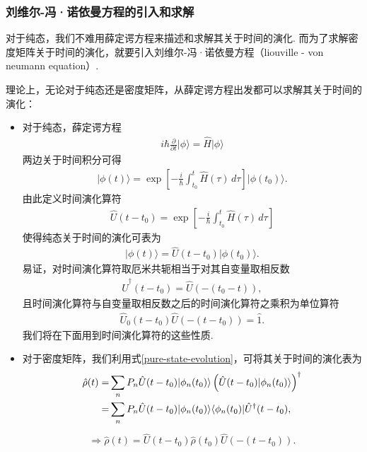 \documentclass{assignment}
\begin{document}
\subsubsection{刘维尔-冯·诺依曼方程的引入和求解}
对于纯态，我们不难用薛定谔方程来描述和求解其关于时间的演化. 而为了求解密度矩阵关于时间的演化，就要引入刘维尔-冯·诺依曼方程（liouville - von neumann equation）.

理论上，无论对于纯态还是密度矩阵，从薛定谔方程出发都可以求解其关于时间的演化：
\begin{itemize}
    \item 对于纯态，薛定谔方程
    \begin{align}
        i\hbar\frac{\partial}{\partial t}\lvert\phi\rangle=\hat{H}\lvert\phi\rangle
    \end{align}
    两边关于时间积分可得
    \begin{align}
        \lvert\phi(t)\rangle=\exp\left[-\frac{i}{\hbar}\int_{t_0}^t\hat{H}(\tau)\,d\tau\right]\lvert\phi(t_0)\rangle.
    \end{align}
    由此定义时间演化算符
    \begin{align}
        \hat{U}(t-t_0)=\exp\left[-\frac{i}{\hbar}\int_{t_0}^t\hat{H}(\tau)\,d\tau\right]
    \end{align}
    使得纯态关于时间的演化可表为
    \begin{align}
        \label{pure-state-evolution}
        \boxed{\lvert\phi(t)\rangle=\hat{U}(t-t_0)\lvert\phi(t_0)\rangle.}
    \end{align}
    易证，对时间演化算符取厄米共轭相当于对其自变量取相反数
    \begin{align}
        \hat{U}^{\dagger}(t-t_0)=\hat{U}(-(t_0-t)),
    \end{align}
    且时间演化算符与自变量取相反数之后的时间演化算符之乘积为单位算符
    \begin{align}
        \hat{U}_0(t-t_0)\hat{U}(-(t-t_0))=\hat{1}.
    \end{align}
    我们将在下面用到时间演化算符的这些性质.
    \item 对于密度矩阵，我们利用式\eqref{pure-state-evolution}，可将其关于时间的演化表为
    \begin{align}
        \notag\hat{\rho}(t)=&\sum_nP_n\hat{U}(t-t_0)\lvert\phi_n(t_0)\rangle\left(\hat{U}(t-t_0)\lvert\phi_n(t_0)\rangle\right)^{\dagger}\\
        \notag=&\sum_nP_n\hat{U}(t-t_0)\lvert\phi_n(t_0)\rangle\langle\phi_n(t_0)\rvert\hat{U}^{\dagger}(t-t_0),
    \end{align}
    \begin{align}
        \label{mixture-state-evolution}
        \Longrightarrow\boxed{\hat{\rho}(t)=\hat{U}(t-t_0)\hat{\rho}(t_0)\hat{U}(-(t-t_0)).}
    \end{align}
\end{itemize}
\end{document}
